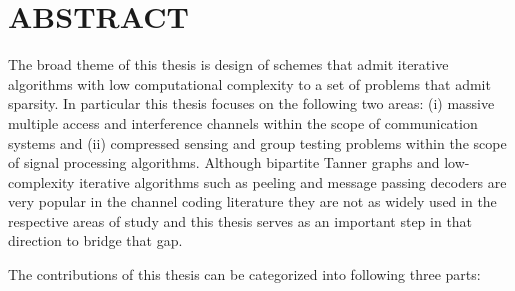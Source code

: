 \chapter*{ABSTRACT}

\pagestyle{plain} %
\setcounter{page}{2}

\indent The broad theme of this thesis is design of schemes that admit iterative algorithms with low computational complexity to a set of problems that admit sparsity. In particular this thesis focuses on the following two areas: (i) massive multiple access and interference channels within the scope of communication systems and (ii) compressed sensing and group testing problems within the scope of signal processing algorithms. Although bipartite Tanner graphs and low-complexity iterative algorithms such as peeling and message passing decoders are very popular in the channel coding literature \cite{richardson2008modern} they are not as widely used in the respective areas of study and this thesis serves as an important step in that direction to bridge that gap. 

The contributions of this thesis can be categorized into following three parts:

